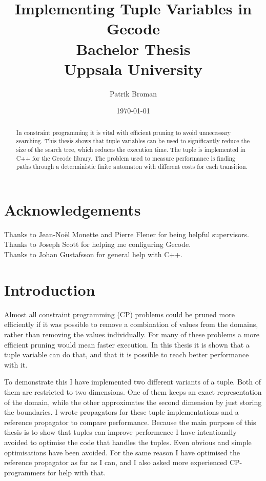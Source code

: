 \documentclass[a4paper,11pt]{article}
\title{\textbf{Implementing Tuple Variables in Gecode \\
	Bachelor Thesis \\
    Uppsala University  \\
  }
}
\author{Patrik Broman}
\date{\today}
\begin{document}
\maketitle

\begin{abstract}
In constraint programming it is vital with efficient pruning to avoid unnecessary searching. This thesis shows that tuple variables can be used to significantly reduce the size of the search tree, which reduces the execution time. The tuple is implemented in C++ for the Gecode library. The problem used to measure performance is finding paths through a deterministic finite automaton with different costs for each transition.
\end{abstract}

\setcounter{tocdepth}{2}
\tableofcontents

\section*{Acknowledgements}
Thanks to Jean-No\"{e}l Monette and Pierre Flener for being helpful supervisors. \\
Thanks to Joseph Scott for helping me configuring Gecode. \\
Thanks to Johan Gustafsson for general help with C++. \\

\section{Introduction}
Almost all constraint programming (CP) problems could be pruned more efficiently if it was possible to remove a combination of values from the domains, rather than removing the values individually. For many of these problems a more efficient pruning would mean faster execution. In this thesis it is shown that a tuple variable can do that, and that it is possible to reach better performance with it.

To demonstrate this I have implemented two different variants of a tuple. Both of them are restricted to two dimensions. One of them keeps an exact representation of the domain, while the other approximates the second dimension by just storing the boundaries. I wrote propagators for these tuple implementations and a reference propagator to compare performance. Because the main purpose of this thesis is to show that tuples can improve performence I have intentionally avoided to optimise the code that handles the tuples. Even obvious and simple optimisations have been avoided. For the same reason I have optimised the reference propagator as far as I can, and I also asked more experienced CP-programmers for help with that.
\end{document}
